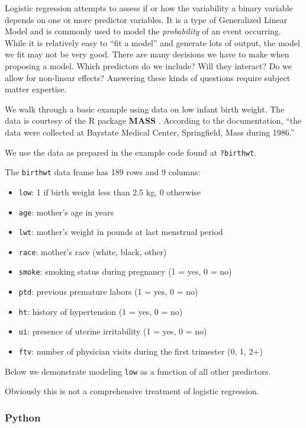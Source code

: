 \documentclass[
]{book}
\providecommand{\tightlist}{%
  \setlength{\itemsep}{0pt}\setlength{\parskip}{0pt}}
\begin{document}
Logistic regression attempts to assess if or how the variability a binary variable depends on one or more predictor variables. It is a type of Generalized Linear Model and is commonly used to model the \emph{probability} of an event occurring. While it is relatively easy to ``fit a model'' and generate lots of output, the model we fit may not be very good. There are many decisions we have to make when proposing a model. Which predictors do we include? Will they interact? Do we allow for non-linear effects? Answering these kinds of questions require subject matter expertise.

We walk through a basic example using data on low infant birth weight. The data is courtesy of the R package \textbf{MASS} \citep{MASS}. According to the documentation, ``the data were collected at Baystate Medical Center, Springfield, Mass during 1986.''

We use the data as prepared in the example code found at \texttt{?birthwt}.

The \texttt{birthwt} data frame has 189 rows and 9 columns:

\begin{itemize}
\tightlist
\item
  \texttt{low}: 1 if birth weight less than 2.5 kg, 0 otherwise
\item
  \texttt{age}: mother's age in years
\item
  \texttt{lwt}: mother's weight in pounds at last menstrual period
\item
  \texttt{race}: mother's race (white, black, other)
\item
  \texttt{smoke}: smoking status during pregnancy (1 = yes, 0 = no)
\item
  \texttt{ptd}: previous premature labors (1 = yes, 0 = no)
\item
  \texttt{ht}: history of hypertension (1 = yes, 0 = no)
\item
  \texttt{ui}: presence of uterine irritability (1 = yes, 0 = no)
\item
  \texttt{ftv}: number of physician visits during the first trimester (0, 1, 2+)
\end{itemize}

Below we demonstrate modeling \texttt{low} as a function of all other predictors.

Obviously this is not a comprehensive treatment of logistic regression.

\hypertarget{python-50}{%
\subsubsection*{Python}\label{python-50}}
\end{document}
